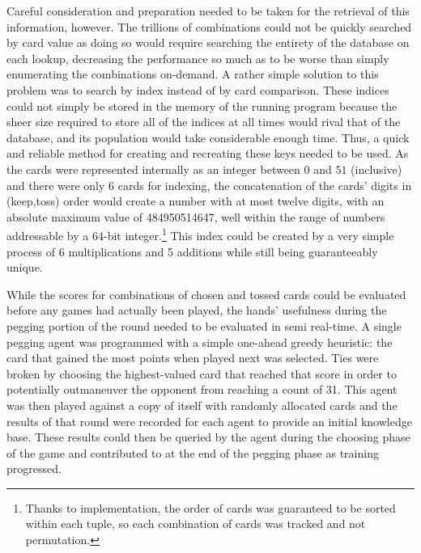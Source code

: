 Careful consideration and preparation needed to be taken
for the retrieval of this information, however.
%
The trillions of combinations could not be quickly searched by card value as
doing so would require searching the entirety of the database on each lookup,
decreasing the performance so much as to be worse than simply
enumerating the combinations on-demand.
%
A rather simple solution to this problem was to search by index
instead of by card comparison.
%
These indices could not simply be stored in the memory of the running program
because the sheer size required to store all of the indices at all times
would rival that of the database,
and its population would take considerable enough time.
%
Thus, a quick and reliable method for creating and recreating these keys
needed to be used.
%
As the cards were represented internally as an integer between $0$ and $51$
(inclusive)
and there were only 6 cards for indexing,
the concatenation of the cards' digits in (keep,toss) order
would create a number with at most twelve digits,
with an absolute maximum value of 484950514647,
well within the range of numbers addressable by a 64-bit integer.\footnote{
	Thanks to implementation,
	the order of cards was guaranteed to be sorted within each tuple,
	so each combination of cards was tracked and not permutation.
}
%
This index could be created by a very simple process of 6 multiplications and
5 additions
while still being guaranteeably unique.

While the scores for combinations of chosen and tossed cards could be evaluated 
before any games had actually been played,
the hands' usefulness during the pegging portion of the round needed to be
evaluated in semi real-time.
%
A single pegging agent was programmed with a simple one-ahead greedy heuristic:
the card that gained the most points when played next was selected.
%
Ties were
broken by choosing the highest-valued card that reached that score
in order to potentially outmaneuver the opponent from reaching a count of 31.
%
This agent was then played against a copy of itself with randomly allocated
cards and the results of that round were recorded for each agent to provide an
initial knowledge base.
%
These results could then be queried by the agent during the choosing phase of the
game and contributed to at the end of the pegging phase as training progressed.

